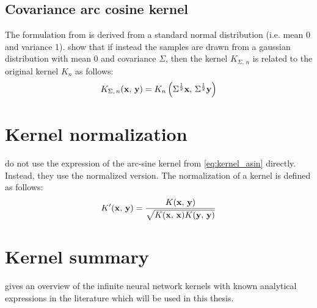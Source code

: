 \subsection{Covariance arc cosine kernel}

The formulation from \textcite{choLargemarginClassificationInfinite2010} is derived from a standard normal
distribution (i.e. mean 0 and variance 1).
\Textcite{pandeyGoDeepWide2014} show that if instead the samples are drawn from a gaussian
distribution with mean 0 and covariance $\Sigma$, then the kernel $K_{\Sigma,\,n}$ is related to the
original kernel $K_{n}$ as follows:
\begin{equation}\label{eq:kernel_pandey}
K_{\Sigma,\,n}(\mathbf{x},\,\mathbf{y}) = K_{n}\left(\Sigma^{\frac{1}{2}}\mathbf{x},\,\Sigma^{\frac{1}{2}}\mathbf{y}\right)
\end{equation}

\section{Kernel normalization}%

\Textcite{frenayParameterinsensitiveKernelExtreme2011} do not use the expression
of the arc-sine kernel from \cref{eq:kernel_asin} directly. Instead, they use
the normalized version. The normalization of a kernel is defined as follows:
\begin{equation}\label{eq:kernel_normalization}
    K'(\mathbf{x},\,\mathbf{y}) = \frac{K(\mathbf{x},\,\mathbf{y})}{\sqrt{K(\mathbf{x},\,\mathbf{x})K(\mathbf{y},\,\mathbf{y})}}
\end{equation}

\section{Kernel summary}
\label{sec:kernels}

 gives an overview of the infinite neural network
kernels with known analytical expressions in the literature which will be
used in this thesis.

